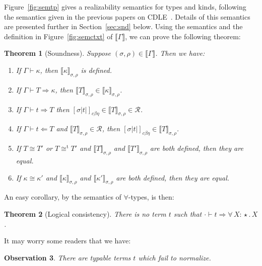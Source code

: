 \documentclass{article}
\newcommand{\abs}[4]{{#1}\, #2\! : \! #3.\, #4}
\newcommand{\interp}[1]{\llbracket #1 \rrbracket}
\newcommand{\tpcheck}[0]{\Leftarrow}
\newcommand{\tpsynth}[0]{\Rightarrow}
\newcommand{\cbe}[0]{c\beta\eta}
\newtheorem{theorem}{Theorem}
\newtheorem{observation}[theorem]{Observation}
\begin{document}
Figure~\ref{fig:semtp} gives a realizability semantics for types and
kinds, following the semantics given in the previous papers on
CDLE~\cite{stump18,stump17}.  Details of this semantics are presented
further in Section~\ref{sec:snd} below.  Using the semantics and the
definition in Figure~\ref{fig:semctxt} of $\interp{\Gamma}$, we can
prove the following theorem:
\begin{theorem}[Soundness]
\label{thm:snd}
Suppose $(\sigma,\rho)\in\interp{\Gamma}$.  Then we have:
\begin{enumerate}
\item If $\Gamma\vdash \kappa$, then $\interp{\kappa}_{\sigma,\rho}$ is defined.
\item If $\Gamma\vdash T \tpsynth \kappa$, then $\interp{T}_{\sigma,\rho}\in\interp{\kappa}_{\sigma,\rho}$.
\item If $\Gamma\vdash t \tpsynth T$ then $[\sigma |t|]_{\cbe}\in\interp{T}_{\sigma,\rho}\in \mathcal{R}$.
\item If $\Gamma\vdash t \tpcheck T$ and $\interp{T}_{\sigma,\rho}\in \mathcal{R}$, then
    $[\sigma |t|]_{\cbe}\in\interp{T}_{\sigma,\rho}$.
\item If $T \cong T'$ or $T \cong^{\text{t}} T'$ and $\interp{T}_{\sigma,\rho}$ and $\interp{T'}_{\sigma,\rho}$ are both defined, then they are equal.
\item If \(\kappa \cong \kappa'\) and \(\interp{\kappa}_{\sigma,\rho}\) and
  \(\interp{\kappa'}_{\sigma,\rho}\) are both defined, then they are equal.
\end{enumerate}
\end{theorem}

An easy corollary, by the semantics of $\forall$-types, is then:

\begin{theorem}[Logical consistency]
\label{thm:consis}
  There is no term $t$ such that $\cdot \vdash t \tpsynth \abs{\forall}{X}{\star}{X}$.
\end{theorem}

It may worry some readers that we have:
\begin{observation}
  There are typable terms $t$ which fail to normalize.
\end{observation}
\end{document}
